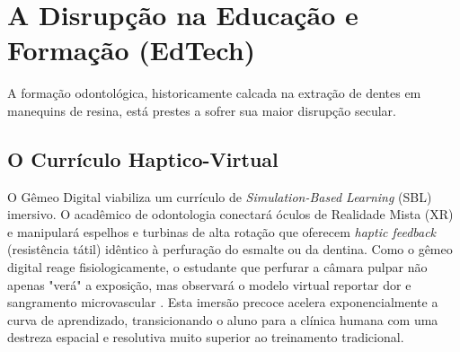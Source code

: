 \section{A Disrupção na Educação e Formação (EdTech)}

A formação odontológica, historicamente calcada na extração de dentes em manequins de resina, está prestes a sofrer sua maior disrupção secular.

\subsection{O Currículo Haptico-Virtual}

O Gêmeo Digital viabiliza um currículo de \textit{Simulation-Based Learning} (SBL) imersivo. O acadêmico de odontologia conectará óculos de Realidade Mista (XR) e manipulará espelhos e turbinas de alta rotação que oferecem \textit{haptic feedback} (resistência tátil) idêntico à perfuração do esmalte ou da dentina. Como o gêmeo digital reage fisiologicamente, o estudante que perfurar a câmara pulpar não apenas "verá" a exposição, mas observará o modelo virtual reportar dor e sangramento microvascular \cite{olawade2026advancing}. Esta imersão precoce acelera exponencialmente a curva de aprendizado, transicionando o aluno para a clínica humana com uma destreza espacial e resolutiva muito superior ao treinamento tradicional.
